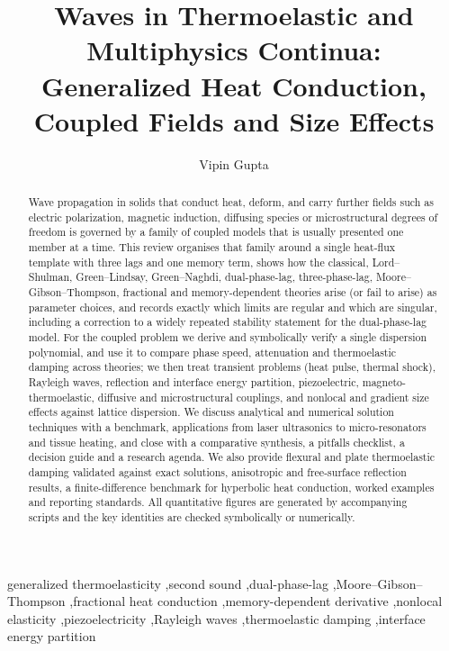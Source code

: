 \documentclass[review,12pt]{elsarticle}
\begin{document}
\begin{frontmatter}

\title{Waves in Thermoelastic and Multiphysics Continua:\\
 Generalized Heat Conduction, Coupled Fields and Size Effects}

\author{Vipin Gupta}
\address{Gurugram University}

\begin{abstract}
Wave propagation in solids that conduct heat, deform, and carry further fields such as electric polarization, magnetic induction, diffusing species or microstructural degrees of freedom is governed by a family of coupled models that is usually presented one member at a time. This review organises that family around a single heat-flux template with three lags and one memory term, shows how the classical, Lord--Shulman, Green--Lindsay, Green--Naghdi, dual-phase-lag, three-phase-lag, Moore--Gibson--Thompson, fractional and memory-dependent theories arise (or fail to arise) as parameter choices, and records exactly which limits are regular and which are singular, including a correction to a widely repeated stability statement for the dual-phase-lag model. For the coupled problem we derive and symbolically verify a single dispersion polynomial, and use it to compare phase speed, attenuation and thermoelastic damping across theories; we then treat transient problems (heat pulse, thermal shock), Rayleigh waves, reflection and interface energy partition, piezoelectric, magneto-thermoelastic, diffusive and microstructural couplings, and nonlocal and gradient size effects against lattice dispersion. We discuss analytical and numerical solution techniques with a benchmark, applications from laser ultrasonics to micro-resonators and tissue heating, and close with a comparative synthesis, a pitfalls checklist, a decision guide and a research agenda. We also provide flexural and plate thermoelastic damping validated against exact solutions, anisotropic and free-surface reflection results, a finite-difference benchmark for hyperbolic heat conduction, worked examples and reporting standards. All quantitative figures are generated by accompanying scripts and the key identities are checked symbolically or numerically.
\end{abstract}

\begin{keyword}
generalized thermoelasticity \sep second sound \sep dual-phase-lag \sep Moore--Gibson--Thompson \sep fractional heat conduction \sep memory-dependent derivative \sep nonlocal elasticity \sep piezoelectricity \sep Rayleigh waves \sep thermoelastic damping \sep interface energy partition
\end{keyword}

\end{frontmatter}
\end{document}
